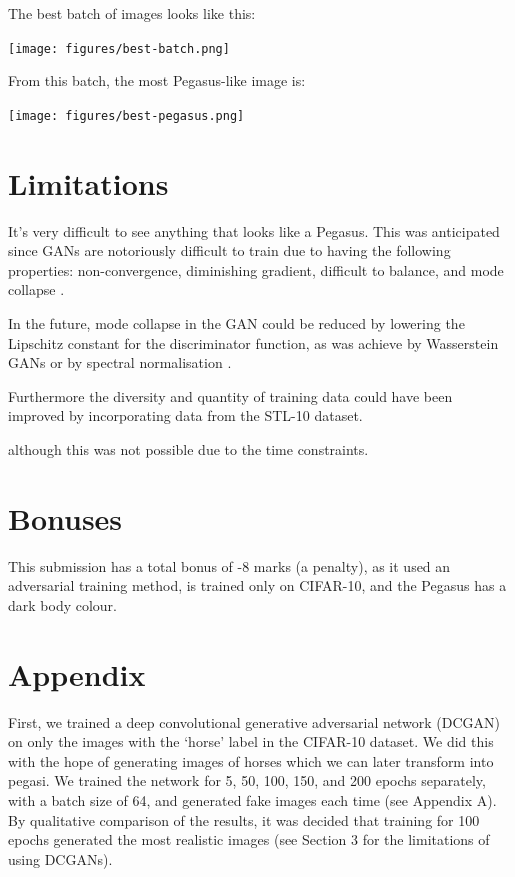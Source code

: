 \documentclass{article}
\begin{document}
The best batch of images looks like this:
\begin{center}
    \texttt{[image: figures/best-batch.png]}
\end{center}

From this batch, the most Pegasus-like image is:
\begin{center}
    \texttt{[image: figures/best-pegasus.png]}
\end{center}

\section{Limitations}
It's very difficult to see anything that looks like a Pegasus. This was anticipated since GANs are notoriously difficult to train due to having the following properties: non-convergence, diminishing gradient, difficult to balance, and mode collapse \cite{}. 

In the future, mode collapse in the GAN could be reduced by lowering the Lipschitz constant for the discriminator function, as was achieve by Wasserstein GANs \cite{arjovsky2017wasserstein} or by spectral normalisation \cite{DBLP:journals/corr/abs-1802-05957}. 

Furthermore the diversity and quantity of training data could have been improved by incorporating data from the STL-10 dataset. 

although this was not possible due to the time constraints.

\section*{Bonuses}
This submission has a total bonus of -8 marks (a penalty), as it used an adversarial training method, is trained only on CIFAR-10, and the Pegasus has a dark body colour.

\section{Appendix}
First, we trained a deep convolutional generative adversarial network (DCGAN)~\cite{} on only the images with the `horse' label in the CIFAR-10 dataset. We did this with the hope of generating images of horses which we can later transform into pegasi. We trained the network for 5, 50, 100, 150, and 200 epochs separately, with a batch size of 64, and generated fake images each time (see Appendix A). By qualitative comparison of the results, it was decided that training for 100 epochs generated the most realistic images (see Section 3 for the limitations of using DCGANs).  
\end{document}
